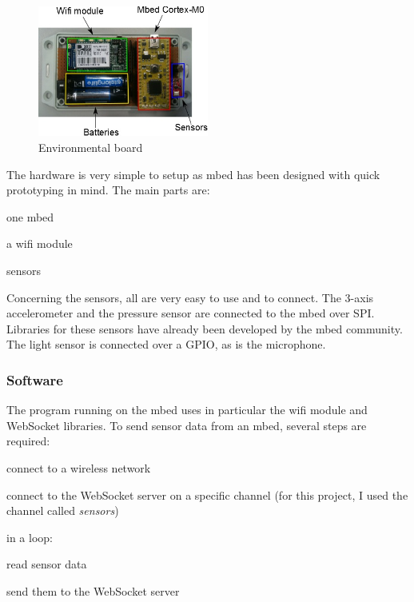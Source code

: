 \documentclass[pdftex,10pt,a4paper]{report}
\newenvironment{packed_item}{
\begin{itemize}
  \setlength{\itemsep}{1pt}
  \setlength{\parskip}{0pt}
  \setlength{\parsep}{0pt}
}{\end{itemize}}
\begin{document}
\begin{figure}[h!]
		\centering
		\includegraphics[width=0.5\textwidth]{./env_board.jpg}
		\caption{Environmental board}
		\label{Environmental board}
\end{figure}

The hardware is very simple to setup as mbed has been designed with quick prototyping in mind. The main parts are:
\begin{packed_item}
	\item one mbed
	\item a wifi module
	\item sensors
\end{packed_item}

Concerning the sensors, all are very easy to use and to connect. The 3-axis accelerometer and the pressure sensor are connected to the mbed over SPI. Libraries for these sensors have already been developed by the mbed community. The light sensor is connected over a GPIO, as is the microphone. 


\subsubsection{Software}
The program running on the mbed uses in particular the wifi module and WebSocket libraries. To send sensor data from an mbed, several steps are required:
\begin{packed_item}
	\item connect to a wireless network
	\item connect to the WebSocket server on a specific channel (for this project, I used the channel called \textit{sensors})
	\item in a loop:
		\begin{packed_item}
			\item read sensor data
			\item send them to the WebSocket server
		\end{packed_item}
\end{packed_item}
\end{document}
